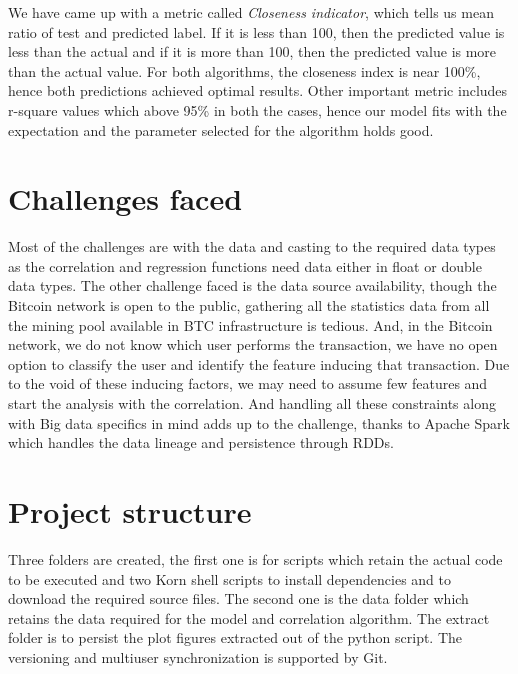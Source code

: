 \documentclass[sigconf]{acmart}
\begin{document}
We have came up with a metric called {\em Closeness indicator}, which tells us mean ratio of test and predicted label. If it is less than 100, then the predicted value is less than the actual and if it is more than 100, then the predicted value is more than the actual value.
For both algorithms, the closeness index is near 100\%, hence both predictions achieved optimal results. Other important metric includes r-square values which above 95\% in both the cases, hence our model fits with the expectation and the parameter selected for the algorithm holds good. 



\section{Challenges faced}
Most of the challenges are with the data and casting to the required data types as the correlation and regression functions need data either in float or double data types. The other challenge faced is the data source availability, though the Bitcoin network is open to the public, gathering all the statistics data from all the mining pool available in BTC infrastructure is tedious. And, in the Bitcoin network, we do not know which user performs the transaction, we have no open option to classify the user and identify the feature inducing that transaction. Due to the void of these inducing factors, we may need to assume few features and start the analysis with the correlation. And handling all these constraints along with Big data specifics in mind adds up to the challenge, thanks to Apache Spark which handles the data lineage and persistence through RDDs. 

\section{Project structure}
Three folders are created, the first one is for scripts which retain the actual code to be executed and two Korn shell scripts to install dependencies and to download the required source files. The second one is the data folder which retains the data required for the model and correlation algorithm. The extract folder is to persist the plot figures extracted out of the python script. The versioning and multiuser synchronization is supported by Git. 
\end{document}
